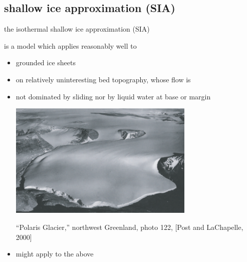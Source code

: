 \subsection{shallow ice approximation (SIA)}

\begin{frame}{the isothermal shallow ice approximation (SIA)}

is a model which applies reasonably well to
\begin{itemize}
\item grounded ice sheets
\item on relatively uninteresting bed topography, whose flow is
\item not dominated by sliding nor by liquid water at base or margin
\begin{center}
  \includegraphics[width=0.7\textwidth]{photos/polaris}

\tiny ``Polaris Glacier,'' northwest Greenland, photo 122, [Post and LaChapelle, 2000]
\end{center}
\item might apply to the above
\end{itemize}
\end{frame}


